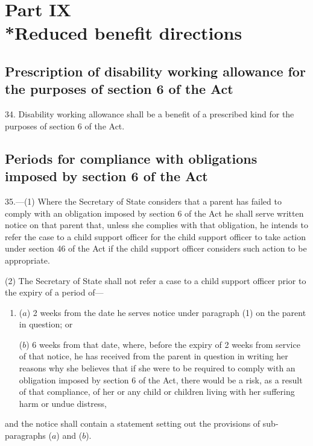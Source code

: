 \documentclass[a4paper]{article}
\newcommand{\parthead}{}
\begin{document}
\section[Part IX --- Reduced benefit directions]{Part IX\\*Reduced benefit directions}

\renewcommand\parthead{--- Part IX}

\subsection[34. Prescription of disability working allowance for the purposes of section 6 of the Act]{Prescription of disability working allowance for the purposes of section 6 of the Act}

34.  Disability working allowance shall be a benefit of a prescribed kind for the purposes of section 6 of the Act.

\subsection[35. Periods for compliance with obligations imposed by section 6 of the Act]{Periods for compliance with obligations imposed by section 6 of the Act}

35.—(1) Where the Secretary of State considers that a parent has failed to comply with an obligation imposed by section 6 of the Act he shall serve written notice on that parent that, unless she complies with that obligation, he intends to refer the case to a child support officer for the child support officer to take action under section 46 of the Act if the child support officer considers such action to be appropriate.


(2) The Secretary of State shall not refer a case to a child support officer prior to the expiry of a period of—
\begin{enumerate}\item[]
($a$) 2 weeks from the date he serves notice under paragraph (1) on the parent in question; or

($b$) 6 weeks from that date, where, before the expiry of 2 weeks from service of that notice, he has received from the parent in question in writing her reasons why she believes that if she were to be required to comply with an obligation imposed by section 6 of the Act, there would be a risk, as a result of that compliance, of her or any child or children living with her suffering harm or undue distress,
\end{enumerate}
and the notice shall contain a statement setting out the provisions of sub-paragraphs ($a$) and ($b$).
\end{document}
